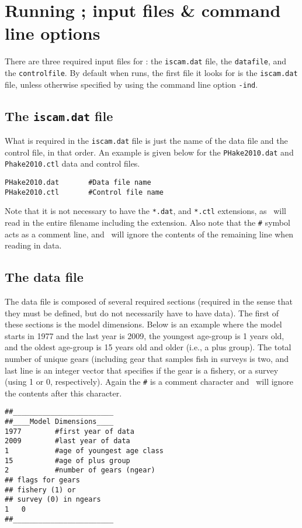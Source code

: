 
\section{Running \iscam; input files \& command line options}
\begin{multicols}{2}


There are three required input files for \iscam: the \verb"iscam.dat" file, the \verb"datafile", and the \verb"controlfile".  By default when \iscam runs, the first file it looks for is the \verb"iscam.dat" file, unless otherwise specified by using the command line option \verb"-ind".


\subsection{The \texttt{iscam.dat} file}
What is required in the \verb"iscam.dat" file is just the name of the data file and the control file, in that order.  An example is given below for the \texttt{PHake2010.dat} and \texttt{Phake2010.ctl} data and control files.
\begin{verbatim}
PHake2010.dat		#Data file name
PHake2010.ctl		#Control file name
\end{verbatim}
Note that it is not necessary to have the \verb"*.dat", and \verb"*.ctl" extensions, as \iscam\ will read in the entire filename including the extension.  Also note that the \verb"#" symbol acts as a comment line, and \iscam\ will ignore the contents of the remaining line when reading in data.

\subsection{The data file}
The data file is composed of several required sections (required in the sense that they must be defined, but do not necessarily have to have data).  The first of these sections is the model dimensions.  Below is an example where the model starts in 1977 and the last year is 2009, the youngest age-group is 1 years old, and the oldest age-group is 15 years old and older (i.e., a plus group).  The total number of unique gears (including gear that samples fish in surveys is two, and last line is an integer vector that specifies if the gear is a fishery, or a survey (using 1 or 0, respectively).  Again the \verb"#" is a comment character and \iscam\ will ignore the contents after this character.
\begin{verbatim}
##________________________
##____Model Dimensions____
1977		#first year of data
2009		#last year of data
1			#age of youngest age class
15			#age of plus group
2			#number of gears (ngear)
## flags for gears 
## fishery (1) or 
## survey (0) in ngears
1	0
##________________________
\end{verbatim}


\end{multicols}
